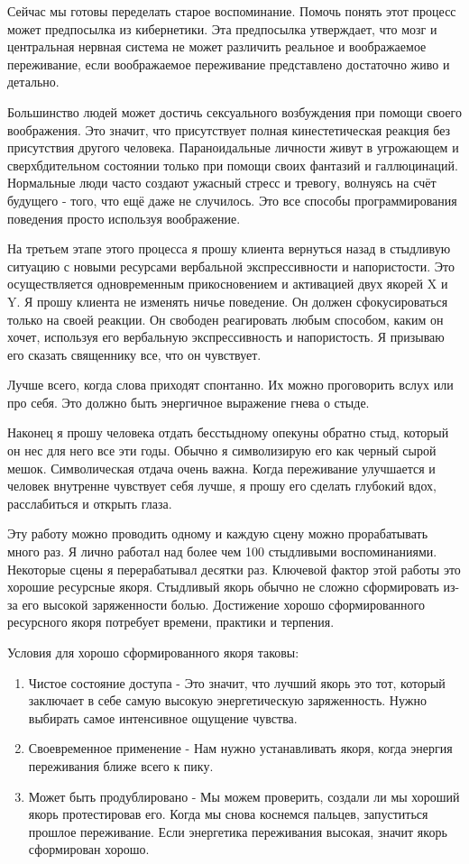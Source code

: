 \documentclass[10pt, fleqn]{article}
\begin{document}
Сейчас мы готовы переделать старое воспоминание. Помочь понять этот процесс может предпосылка из кибернетики. Эта предпосылка утверждает, что мозг и центральная нервная система не может различить реальное и воображаемое переживание, если воображаемое переживание представлено достаточно живо и детально.

Большинство людей может достичь сексуального возбуждения при помощи своего воображения. Это значит, что присутствует полная кинестетическая реакция без присутствия другого человека. Параноидальные личности живут в угрожающем и сверхбдительном состоянии только при помощи своих фантазий и галлюцинаций. Нормальные люди часто создают ужасный стресс и тревогу, волнуясь на счёт будущего - того, что ещё даже не случилось. Это все способы программирования поведения просто используя воображение.

На третьем этапе этого процесса я прошу клиента вернуться назад в стыдливую ситуацию с новыми ресурсами вербальной экспрессивности и напористости. Это осуществляется одновременным прикосновением и активацией двух якорей X и Y. Я прошу клиента не изменять ничье поведение. Он должен сфокусироваться только на своей реакции. Он свободен реагировать любым способом, каким он хочет, используя его вербальную экспрессивность и напористость. Я призываю его сказать священнику все, что он чувствует.

Лучше всего, когда слова приходят спонтанно. Их можно проговорить вслух или про себя. Это должно быть энергичное выражение гнева о стыде.

Наконец я прошу человека отдать бесстыдному опекуны обратно стыд, который он нес для него все эти годы. Обычно я символизирую его как черный сырой мешок. Символическая отдача очень важна. Когда переживание улучшается и человек внутренне чувствует себя лучше, я прошу его сделать глубокий вдох, расслабиться и открыть глаза.


Эту работу можно проводить одному и каждую сцену можно прорабатывать много раз. Я лично работал над более чем 100 стыдливыми воспоминаниями. Некоторые сцены я перерабатывал десятки раз. Ключевой фактор этой работы это хорошие ресурсные якоря. Стыдливый якорь обычно не сложно сформировать из-за его высокой заряженности болью. Достижение хорошо сформированного ресурсного якоря потребует времени, практики и терпения.

Условия для хорошо сформированного якоря таковы:

\begin{enumerate}
\item Чистое состояние доступа - Это значит, что лучший якорь это тот, который заключает в себе самую высокую энергетическую заряженность. Нужно выбирать самое интенсивное ощущение чувства.
\item Своевременное применение - Нам нужно устанавливать якоря, когда энергия переживания ближе всего к пику.
\item Может быть продублировано - Мы можем проверить, создали ли мы хороший якорь протестировав его. Когда мы снова коснемся пальцев, запуститься прошлое переживание. Если энергетика переживания высокая, значит якорь сформирован хорошо.
\end{enumerate}
\end{document}
